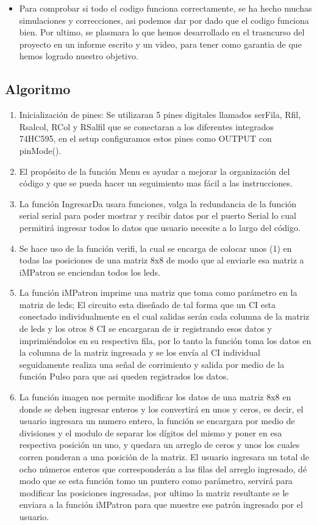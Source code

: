 \documentclass{article}
\begin{document}
\begin{itemize}
    \item Para comprobar si todo el codigo funciona correctamente, se ha hecho muchas simulaciones y correcciones, asi podemos dar por dado que el codigo funciona bien. Por ultimo, se plasmara lo que hemos desarrollado en el trasncurso del proyecto en un informe escrito y un video, para tener como garantia de que hemos logrado nuestro objetivo.
\end{itemize}
\subsection{Algoritmo}
\begin{enumerate}
    \item Inicialización de pines: Se utilizaran 5 pines digitales llamados serFila, Rfil, Rsalcol, RCol y RSalfil que se conectaran a los diferentes integrados 74HC595, en el setup configuramos estos pines como OUTPUT con pinMode().
    \item  El propósito de la función Menu es ayudar a mejorar la organización del código y que se pueda hacer un seguimiento mas fácil a las instrucciones.
    \item La función IngresarDa usara funciones, valga la redundancia de la función serial serial para poder mostrar y recibir datos por el puerto Serial lo cual permitirá ingresar todos lo datos que usuario necesite a lo largo del código.
    \item Se hace uso de la función verifi, la cual se encarga de colocar unos (1) en todas las posiciones de una matriz 8x8 de modo que al enviarle esa matriz a iMPatron se enciendan todos los leds.
    \item La función iMPatron imprime una matriz que toma como parámetro en la matriz de leds; El circuito esta diseñado de tal forma que un CI esta conectado individualmente en el cual salidas serán cada columna de la matriz de leds y los otros 8 CI se encargaran de ir registrando esos datos y imprimiéndolos en su respectiva fila, por lo tanto la función toma los datos en la columna de la matriz ingresada y se los envía al CI individual seguidamente realiza una señal de corrimiento y salida por medio de la función Pulso para que asi queden registrados los datos.
    \item La función imagen nos permite modificar los datos de una matriz 8x8 en donde se deben ingresar enteros y los convertirá en unos y ceros, es decir, el usuario ingresara un numero entero, la función se encargara por medio de divisiones y el modulo de separar los dígitos del mismo y poner en esa respectiva posición un uno, y quedara un arreglo de ceros y unos los cuales corren ponderan a una posición de la matriz. El usuario ingresara un total de ocho números enteros que corresponderán a las filas del arreglo ingresado, dé modo que se esta función tomo un puntero como parámetro, servirá para modificar las posiciones ingresadas, por ultimo la matriz resultante se le enviara a la función iMPatron para que muestre ese patrón ingresado por el usuario.

\end{enumerate}
\end{document}
